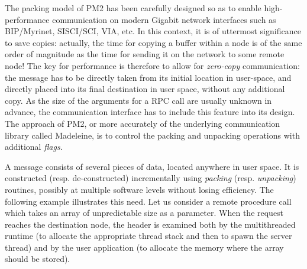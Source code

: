 The packing model of PM2 has been carefully designed so as to enable
high-performance communication on modern Gigabit network interfaces
such as BIP/Myrinet, SISCI/SCI, VIA, etc. In this context, it is of
uttermost significance to save copies: actually, the time for copying
a buffer within a node is of the same order of magnitude as the time
for sending it on the network to some remote node!  The key for
performance is therefore to allow for \emph{zero-copy}
communication: the message has to be directly taken from its initial
location in user-space, and directly placed into its final destination
in user space, without any additional copy. As the size of the
arguments for a RPC call are usually unknown in advance, the
communication interface has to include this feature into its design.
The approach of PM2, or more accurately of the underlying
communication library called Madeleine, is to control the packing and
unpacking operations with additional \emph{flags}.

A message consists of several pieces of data, located anywhere in
user space. It is constructed (resp. de-constructed) incrementally
using \emph{packing} (resp. \emph{unpacking}) routines, possibly at
multiple software levels without losing efficiency. The following
example illustrates this need. Let us consider a remote procedure call
which takes an array of unpredictable size as a parameter. When the
request reaches the destination node, the header is examined both by
the multithreaded runtime (to allocate the appropriate thread stack
and then to spawn the server thread) and by the user application (to
allocate the memory where the array should be stored).

